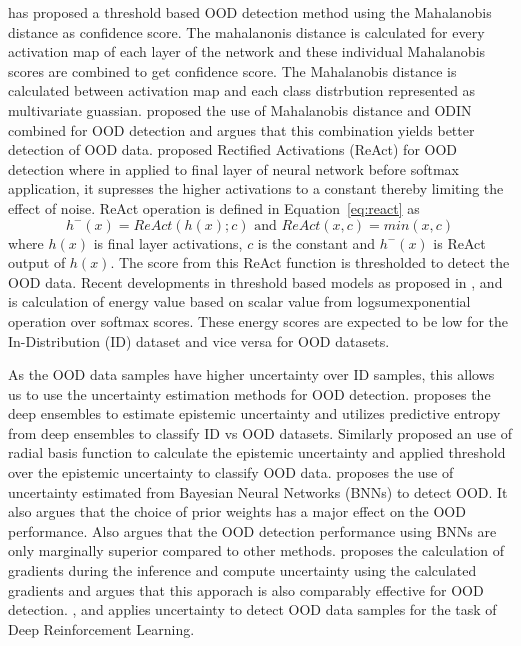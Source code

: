     \cite{lee2018simple_mahalanobis} has proposed a threshold based OOD detection method using the Mahalanobis distance as confidence score.
    The mahalanonis distance is calculated for every activation map of each layer of the network and these individual Mahalanobis scores are combined to get confidence score.
    The Mahalanobis distance is calculated between activation map and each class distrbution represented as multivariate guassian.
    \cite{Maha_plus_ODIN} proposed the use of Mahalanobis distance and ODIN combined for OOD detection and argues that this combination yields better detection of OOD data.
    \cite{ReAct} proposed Rectified Activations (ReAct) for OOD detection where in applied to final layer of neural network before softmax application, it supresses the higher activations to a constant thereby limiting the effect of noise. 
    ReAct operation is defined in Equation~\ref{eq:react} as
    \begin{equation}
        h^{-}(x) = ReAct(h(x); c) \text{ and } ReAct(x, c) = min(x, c) \label{eq:react}
    \end{equation} 
    where $h(x)$ is final layer activations, $c$ is the constant and $h^{-}(x)$ is ReAct output of $h(x)$.
    The score from this ReAct function is thresholded to detect the OOD data. 
    Recent developments in threshold based models as proposed in \cite{Energy_OOD_1}, and \cite{Energy_OOD_2} is calculation of energy value based on scalar value from logsumexponential operation over softmax scores.
    These energy scores are expected to be low for the In-Distribution (ID) dataset and vice versa for OOD datasets.

    As the OOD data samples have higher uncertainty over ID samples, this allows us to use the uncertainty estimation methods for OOD detection.
    \cite{lakshminarayanan2016simple} proposes the deep ensembles to estimate epistemic uncertainty and utilizes predictive entropy from deep ensembles to classify ID vs OOD datasets.
    Similarly \cite{JAmersfoot_RBF} proposed an use of radial basis function to calculate the epistemic uncertainty and applied threshold over the epistemic uncertainty to classify OOD data.
    \cite{UOOD_BNN} proposes the use of uncertainty estimated from Bayesian Neural Networks (BNNs) to detect OOD.
    It also argues that the choice of prior weights has a major effect on the OOD performance.
    Also argues that the OOD detection performance using BNNs are only marginally superior compared to other methods.
    \cite{Grad_UOOD} proposes the calculation of gradients during the inference and compute uncertainty using the calculated gradients and argues that this apporach is also comparably effective for OOD detection.
    \cite{UOOD_RL1}, and \cite{UOOD_RL2} applies uncertainty to detect OOD data samples for the task of Deep Reinforcement Learning.
    
